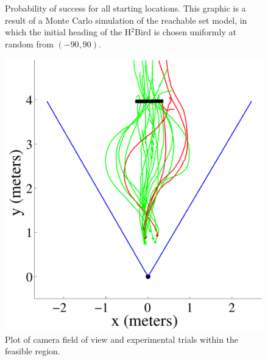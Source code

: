 \documentclass{aamas2013}
\begin{document}
\begin{figure}[tb]
\begin{minipage}[b]{0.45\linewidth}
\caption{Probability of success for all starting locations. This graphic is 
a result of a Monte Carlo simulation of the reachable set model, in which the 
initial heading of the H$^2$Bird is chosen uniformly at random from $(-90,90)$.}
\label{fig:heat_map}
\end{minipage}
\end{figure}

\begin{figure}[tb]
\begin{minipage}[b]{0.45\linewidth}
\centering
\includegraphics[width=\linewidth]{figures/flight_paths_feasible.pdf}
\caption{Plot of camera field of view and experimental trials within the feasible region.}
\label{fig:flight_paths_feasible}
\end{minipage}
\hfill
\begin{minipage}[b]{0.45\linewidth}
\centering

\end{minipage}
\end{figure}
\end{document}
